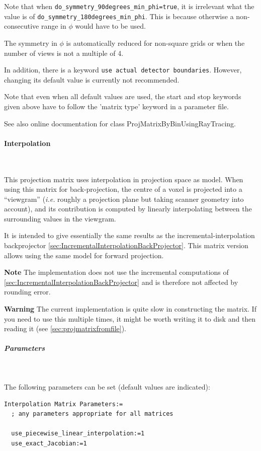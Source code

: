 \documentclass{article}
\newcommand{\subsubsubsection}[1]{\paragraph{#1}\mbox{} \\}
\newcommand{\subsubsubsubsection}[1]{\subparagraph{#1} \mbox{} \\}
\begin{document}
{{Note that when \texttt{do\_symmetry\_90degrees\_min\_phi=true}, 
it is irrelevant what the value is 
of \texttt{do\_symmetry\_180degrees\_min\_phi}. This is because 
otherwise a non-consecutive range in $\phi$ would have to be used.


The symmetry in $\phi$ is automatically reduced for non-square grids 
or when the number of views is not a multiple of 4.



In addition, there is a keyword \texttt{use actual detector boundaries}. 
However, changing its default value is currently not recommended. 




Note that even when all default values are used, the start and 
stop keywords given above have to follow the 'matrix type' keyword 
in a parameter file.


See also online documentation for class ProjMatrixByBinUsingRayTracing. 


{ \subsubsubsection{Interpolation}
}
\label{sec:projmatrixusinginterpolation}
This projection matrix uses interpolation in projection space as model. 
When using this matrix for back-projection, the centre of a voxel is projected 
into a ``viewgram'' (\textit{i.e.} roughly a projection plane but taking scanner 
geometry into account), and its contribution is computed by linearly interpolating
between the surrounding values in the viewgram.

It is intended to give
essentially the same results as the incremental-interpolation backprojector
\ref{sec:IncrementalInterpolationBackProjector}.
This matrix version allows using the same model for forward projection. 

\textbf{Note} The implementation does not use the incremental computations of 
\ref{sec:IncrementalInterpolationBackProjector} and is therefore not affected 
by rounding error.

\textbf{Warning} The current implementation is quite slow in constructing the matrix.
If you need to use this multiple times, it might be worth writing it to disk and
then reading it (see \ref{sec:projmatrixfromfile}).

{ \subsubsubsubsection{Parameters}
}
The following parameters can be set (default values are indicated):
\begin{verbatim}
Interpolation Matrix Parameters:=
  ; any parameters appropriate for all matrices

  use_piecewise_linear_interpolation:=1
  use_exact_Jacobian:=1


\end{verbatim}}}
\end{document}
